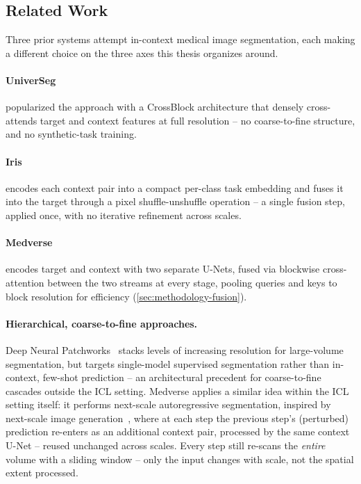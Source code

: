 \subsection{Related Work}\label{sec:fundamentals-relatedwork}

Three prior systems attempt in-context medical image segmentation, each
making a different choice on the three axes this thesis organizes around.

\paragraph{UniverSeg~\cite{butoiUniverSegUniversalMedical2023}} popularized
the approach with a CrossBlock architecture that densely cross-attends
target and context features at full resolution -- no coarse-to-fine
structure, and no synthetic-task training.

\paragraph{Iris~\cite{gaoShowSegmentUniversal2025}} encodes each context
pair into a compact per-class task embedding and fuses it into the target
through a pixel shuffle-unshuffle operation -- a single fusion step,
applied once, with no iterative refinement across scales.

\paragraph{Medverse~\cite{huMedverseUniversalModel2025a}} encodes target
and context with two separate U-Nets, fused via blockwise cross-attention
between the two streams at every stage, pooling queries and keys to block
resolution for efficiency (\autoref{sec:methodology-fusion}).

\paragraph{Hierarchical, coarse-to-fine approaches.} Deep Neural
Patchworks~\cite{reisertDeepNeuralPatchworks2022a} stacks levels of
increasing resolution for large-volume segmentation, but targets
single-model supervised segmentation rather than in-context, few-shot
prediction -- an architectural precedent for coarse-to-fine cascades
outside the ICL setting. Medverse applies a similar idea within the ICL
setting itself: it performs next-scale autoregressive segmentation,
inspired by next-scale image generation~\cite{tian2024visual}, where at
each step the previous step's (perturbed) prediction re-enters as an
additional context pair, processed by the same context U-Net -- reused
unchanged across scales. Every step still re-scans the \emph{entire}
volume with a sliding window -- only the input changes with scale, not
the spatial extent processed.

